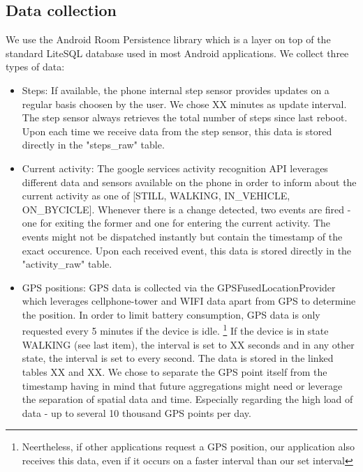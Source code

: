 \subsection {Data collection}
We use the Android Room Persistence library which is a layer on top of the standard LiteSQL database used in most Android applications. We collect three types of data:
\begin{itemize}
	\item Steps: If available, the phone internal step sensor provides updates on a regular basis choosen by the user. We chose XX minutes as update interval. The step sensor always retrieves the total number of steps since last reboot. Upon each time we receive data from the step sensor, this data is stored directly in the "steps\_raw" table.
	\item Current activity: The google services activity recognition API leverages different data and sensors available on the phone in order to inform about the current activity as one of [STILL, WALKING, IN\_VEHICLE, ON\_BYCICLE]. Whenever there is a change detected, two events are fired - one for exiting the former and one for entering the current activity. The events might not be dispatched instantly but contain the timestamp of the exact occurence. Upon each received event, this data is stored directly in the "activity\_raw" table.
	\item GPS positions: GPS data is collected via the GPSFusedLocationProvider which leverages cellphone-tower and WIFI data apart from GPS to determine the position. In order to limit battery consumption, GPS data is only requested every 5 minutes if the device is idle. \footnote{Neertheless, if other applications request a GPS position, our application also receives this data, even if it occurs on a faster interval than our set interval} If the device is in state WALKING (see last item), the interval is set to XX seconds and in any other state, the interval is set to every second. The data is stored in the linked tables XX and XX. We chose to separate the GPS point itself from the timestamp having in mind that future aggregations might need or leverage the separation of spatial data and time. Especially regarding the high load of data - up to several 10 thousand GPS points per day.
\end{itemize}

